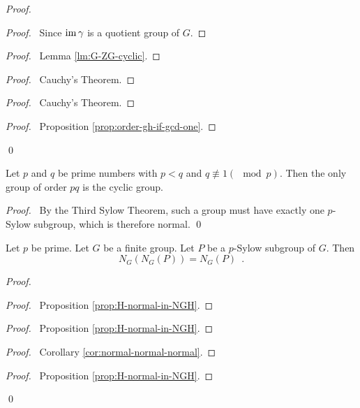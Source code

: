 \begin{proof}
\pf
{}
\begin{proof}
	\pf\ Since $\operatorname{im} \gamma$ is a quotient group of $G$.
\end{proof}
\begin{proof}
	\pf\ Lemma \ref{lm:G-ZG-cyclic}.
\end{proof}
\begin{proof}
	\pf\ Cauchy's Theorem.
\end{proof}
\begin{proof}
	\pf\ Cauchy's Theorem.
\end{proof}
\begin{proof}
	\pf\ Proposition \ref{prop:order-gh-if-gcd-one}.
\end{proof}
\qed
\end{proof}

\begin{cor}
Let $p$ and $q$ be prime numbers with $p < q$ and $q \not\equiv 1 (\mod p)$. Then the only group of order $pq$ is the cyclic group.
\end{cor}

\begin{proof}
\pf\ By the Third Sylow Theorem, such a group must have exactly one $p$-Sylow subgroup, which is therefore normal. \qed
\end{proof}

\begin{prop}
\label{prop:NG-NG}
Let $p$ be prime. Let $G$ be a finite group. Let $P$ be a $p$-Sylow subgroup of $G$. Then
\[ N_G(N_G(P)) = N_G(P) \enspace . \]
\end{prop}

\begin{proof}
\pf
{}
\begin{proof}
	\pf\ Proposition \ref{prop:H-normal-in-NGH}.
\end{proof}
\begin{proof}
	\pf\ Proposition \ref{prop:H-normal-in-NGH}.
\end{proof}
\begin{proof}
	\pf\ Corollary \ref{cor:normal-normal-normal}.
\end{proof}
\begin{proof}
	\pf\ Proposition \ref{prop:H-normal-in-NGH}.
\end{proof}
\qed
\end{proof}

